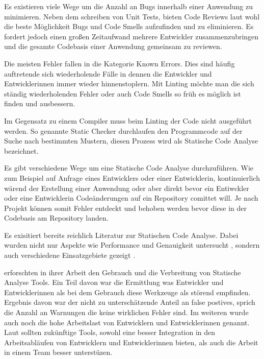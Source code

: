 Es existieren viele Wege um die Anzahl an Bugs innerhalb einer Anwendung zu minimieren. Neben dem schreiben von Unit Tests, bieten Code Reviews laut \textcite{Louridas2006} wohl die beste Möglichkeit Bugs und Code Smells aufzufinden und zu eliminieren. Es fordert jedoch einen großen Zeitaufwand mehrere Entwickler zusammenzubringen und die gesamte Codebasis einer Anwendung gemeinsam zu reviewen.

Die meisten Fehler fallen in die Kategorie Known Errors. Dies sind häufig auftretende sich wiederholende Fälle in dennen die Entwickler und Entwicklerinnen immer wieder hinnenstoplern. Mit Linting möchte man die sich ständig wiederholenden Fehler oder auch Code Smells so früh es möglich ist finden und ausbessern. \autocite{Louridas2006}

Im Gegensatz zu einem Compiler muss beim Linting der Code nicht ausgeführt werden. So genannte Static Checker durchlaufen den Programmcode auf der Suche nach bestimmten Mustern, diesen Prozess wird als Statische Code Analyse bezeichnet. \autocite{Louridas2006}

Es gibt verschiedene Wege um eine Statische Code Analyse durchzuführen. Wie zum Beispiel auf Anfrage eines Entwicklers oder einer Entwicklerin, kontinuierlich wärend der Erstellung einer Anwendung oder aber direkt bevor ein Entiwckler oder eine Entwicklerin Codeänderungen auf ein Repository comittet will. Je nach Projekt können somit Fehler entdeckt und behoben werden bevor diese in der Codebasis am Repository landen.\autocite{Johnson}

Es exisitiert bereits reichlich Literatur zur Statischen Code Analyse. Dabei wurden nicht nur Aspekte wie Performance und Genauigkeit untersucht \autocite{Bessey2010}, sondern auch verschiedene Einsatzgebiete gezeigt \autocite{Bush}.

\textcite{Johnson} erforschten in ihrer Arbeit den Gebrauch und die Verbreitung von Statische Analyse Tools. Ein Teil davon war die Ermittlung was Entwickler und Entwicklerinnen als bei dem Gebrauch diese Werkzeuge als störend empfinden. Ergebnis davon war der nicht zu unterschätzende Anteil an false postives, sprich die Anzahl an Warnungen die keine wirklichen Fehler sind. Im weiteren wurde auch noch die hohe Arbeitslast von Entwicklern und Entwicklerinnen genannt. Laut \textcite{Johnson} sollten zukünftige Tools, sowohl eine besser Integration in den Arbeitsabläufen von Entwicklern und Entwicklerinnen bieten, als auch die Arbeit in einem Team besser unterstüzen.

